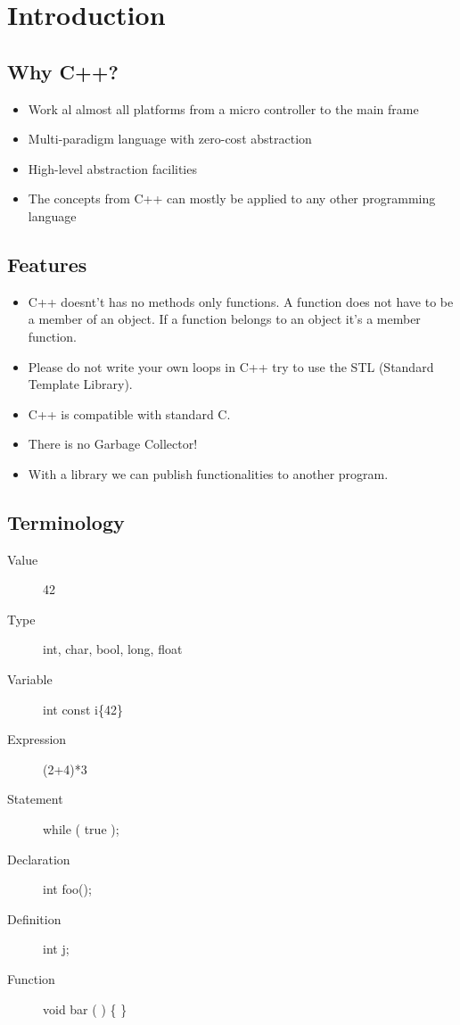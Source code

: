 \section{Introduction}
\subsection{Why C++?}
\begin{itemize}
  \itemsep -0.5em 
  \item Work al almost all platforms from a micro controller to the main frame
  \item Multi-paradigm language with zero-cost abstraction
  \item High-level abstraction facilities
  \item The concepts from C++ can mostly be applied to any other programming language
\end{itemize}

\subsection{Features}
\begin{itemize}
  \itemsep -0.5em 
  \item C++ doesnt't has no methods only functions. A function does not have to be a member of an object. If a function belongs to an object it's a member function.
  \item Please do not write your own loops in C++ try to use the STL (Standard Template Library).
  \item C++ is compatible with standard C.
  \item There is no Garbage Collector!
  \item With a library we can publish functionalities to another program.
\end{itemize}

\subsection{Terminology}
\begin{minipage}{0,5\linewidth}
	\begin{description}
		\item[Value] 42
  		\item[Type] int, char, bool, long, float
  		\item[Variable] int const i\{42\}
  		\item[Expression] (2+4)*3
	\end{description}  
\end{minipage}
\begin{minipage}{0,5\linewidth}
	\begin{description}
   		\item[Statement] while ( true );
  		\item[Declaration] int foo();
  		\item [Definition] int j;
  		\item [Function] void bar ( ) \{ \}
	\end{description}  
\end{minipage}

